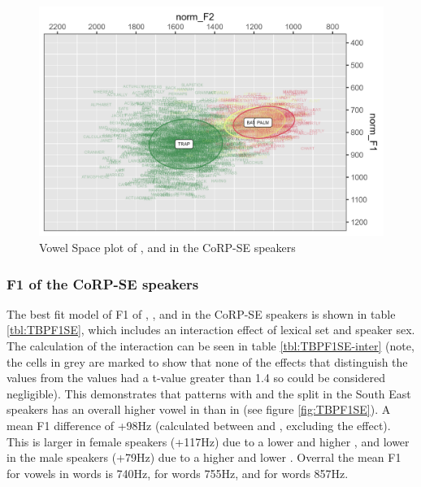 \documentclass[../../../00.FullDoc/tex/ThesisSkeleton-draft2]{subfiles}
\begin{document}
\begin{figure}[h]
	\includegraphics[width=\textwidth]{../figures/TBP-SE-vplot.png}
	\caption{Vowel Space plot of \trap{},\bath{} and \palm{} in the CoRP-SE speakers} \label{fig:TBPvplotSE}
\end{figure}


\subsubsection{F1 of the CoRP-SE speakers}
The best fit model of F1 of \trap{}, \bath{}, and \palm{} in the CoRP-SE speakers is shown in table \ref{tbl:TBPF1SE}, which includes an interaction effect of lexical set and speaker sex. The calculation of the interaction can be seen in table \ref{tbl:TBPF1SE-inter} (note, the cells in grey are marked to show that none of the effects that distinguish the \palm{} values from the \bath{} values had a t-value greater than 1.4 so could be considered negligible). This demonstrates that \bath{} patterns with \palm{} and the \TB{} split in the South East speakers has an overall higher vowel in \trap{} than in \bath{} (see figure \ref{fig:TBPF1SE}). A mean F1 difference of +98Hz (calculated between \bath{} and \trap{}, excluding the \palm{} effect). This is larger in female speakers (+117Hz) due to a lower \bath{} and higher \trap{}, and lower in the male speakers (+79Hz) due to a higher \bath{} and lower \trap{}. Overral the mean F1 for vowels in \bath{} words is 740Hz, for \palm{} words 755Hz, and for \trap{} words 857Hz.

\end{document}
